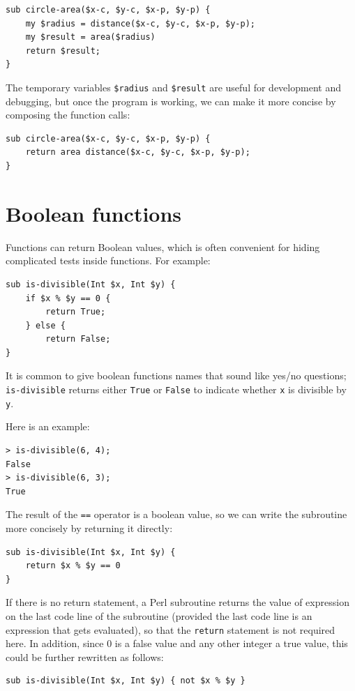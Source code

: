 \begin{verbatim}
sub circle-area($x-c, $y-c, $x-p, $y-p) {
    my $radius = distance($x-c, $y-c, $x-p, $y-p);
    my $result = area($radius)
    return $result;
}
\end{verbatim}
%
The temporary variables {\tt \$radius} and {\tt \$result} are useful for
development and debugging, but once the program is working, we can
make it more concise by composing the function calls:

\begin{verbatim}
sub circle-area($x-c, $y-c, $x-p, $y-p) {
    return area distance($x-c, $y-c, $x-p, $y-p);
}
\end{verbatim}
%

\section{Boolean functions}
\label{boolean}

Functions can return Boolean values, which is often convenient for hiding
complicated tests inside functions.  
For example:

\begin{verbatim}
sub is-divisible(Int $x, Int $y) {
    if $x % $y == 0 {
        return True;
    } else {
        return False;
}
\end{verbatim}
%
It is common to give boolean functions names that sound like yes/no
questions; \verb"is-divisible" returns either {\tt True} or {\tt False}
to indicate whether {\tt x} is divisible by {\tt y}.

Here is an example:

\begin{verbatim}
> is-divisible(6, 4);
False
> is-divisible(6, 3);
True
\end{verbatim}
%
The result of the {\tt ==} operator is a boolean value, so we 
can write the subroutine more concisely by returning it directly:

\begin{verbatim}
sub is-divisible(Int $x, Int $y) {
    return $x % $y == 0
}
\end{verbatim}
%
If there is no return statement, a Perl subroutine returns the 
value of expression on the last code line of the subroutine 
(provided the last code line is an expression that gets evaluated), so that the 
{\tt return} statement is not required here. In addition, 
since 0 is a false value and any other integer a true value, 
this could be further rewritten as follows:
\begin{verbatim}
sub is-divisible(Int $x, Int $y) { not $x % $y }
\end{verbatim}

